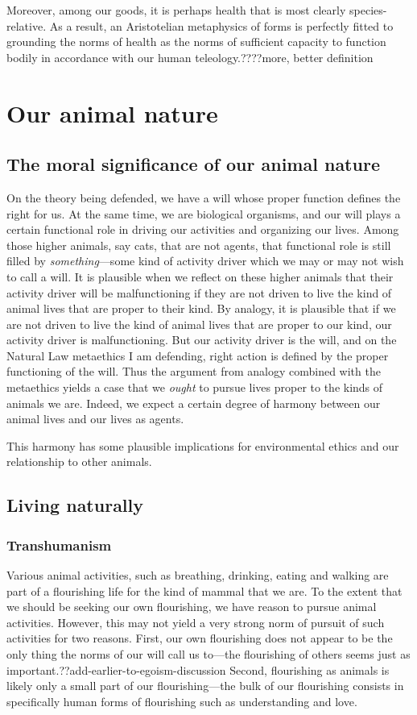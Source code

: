 Moreover, among our goods, it is perhaps health that is most clearly species-relative. As a result, an Aristotelian metaphysics of forms is perfectly fitted to
grounding the norms of health as the norms of sufficient capacity to function bodily in accordance with our human teleology.????more, better definition

\section{Our animal nature}
\subsection{The moral significance of our animal nature}
On the theory being defended, we have a will whose proper function defines the right for us. At the same time, 
we are biological organisms, and our will plays a certain functional role in driving our activities and organizing our 
lives. Among those higher animals, say cats, that are not agents, that functional role is still filled by 
\textit{something}---some kind of activity driver which we may or may not wish to call a will. It is plausible when 
we reflect on these higher animals that their activity driver will be malfunctioning if they are not driven to live the kind
of animal lives that are proper to their kind. By analogy, it is plausible that if we are not driven to live the kind of animal lives
that are proper to our kind, our activity driver is malfunctioning. But our activity driver is the will, and on the Natural Law
metaethics I am defending, right action is defined by the proper functioning of the will. Thus the argument from analogy combined
with the metaethics yields a case that we \textit{ought} to pursue lives proper to the kinds of animals we are. Indeed, we expect
a certain degree of harmony between our animal lives and our lives as agents.

This harmony has some plausible implications for environmental ethics and our relationship to other animals. 

\subsection{Living naturally}
\subsubsection{Transhumanism}
Various animal activities, such as breathing, drinking, eating and walking are part of a flourishing life for the kind of mammal 
that we are. To the extent that we should be seeking our own flourishing, we have reason to pursue animal activities. However,
this may not yield a very strong norm of pursuit of such activities for two reasons. First, our own flourishing does not appear
to be the only thing the norms of our will call us to---the flourishing of others seems just as important.??add-earlier-to-egoism-discussion
Second, flourishing as animals is likely only a small part of our flourishing---the bulk of our flourishing consists in specifically
human forms of flourishing such as understanding and love. 

